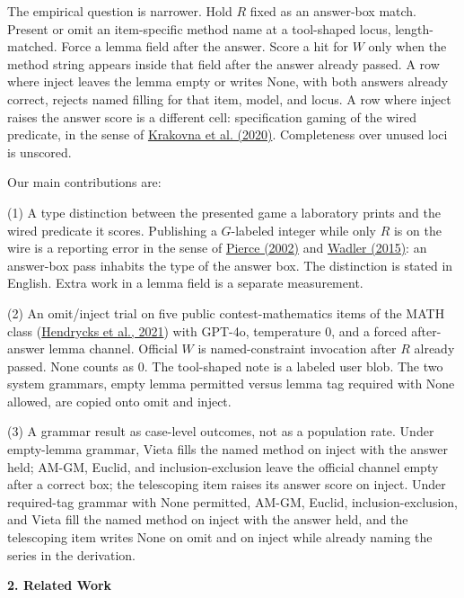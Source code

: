 \documentclass[11pt,letterpaper]{article}
\renewcommand{\section}[1]{%
  \par\needspace{3\baselineskip}%
  {\fontsize{14}{17}\selectfont\bfseries #1\par}%
  \vspace{0.28em}%
}
\begin{document}
The empirical question is narrower. Hold $R$ fixed as an answer-box match. Present or omit an item-specific method name at a tool-shaped locus, length-matched. Force a lemma field after the answer. Score a hit for $W$ only when the method string appears inside that field after the answer already passed. A row where inject leaves the lemma empty or writes None, with both answers already correct, rejects named filling for that item, model, and locus. A row where inject raises the answer score is a different cell: specification gaming of the wired predicate, in the sense of \href{https://deepmind.google/discover/blog/specification-gaming-the-flip-side-of-ai-ingenuity/}{Krakovna et al. (2020)}. Completeness over unused loci is unscored.

Our main contributions are:

(1) A type distinction between the presented game a laboratory prints and the wired predicate it scores. Publishing a $G$-labeled integer while only $R$ is on the wire is a reporting error in the sense of \href{https://mitpress.mit.edu/9780262162098/types-and-programming-languages/}{Pierce (2002)} and \href{https://doi.org/10.1145/2699407}{Wadler (2015)}: an answer-box pass inhabits the type of the answer box. The distinction is stated in English. Extra work in a lemma field is a separate measurement.

(2) An omit/inject trial on five public contest-mathematics items of the MATH class (\href{https://arxiv.org/abs/2103.03874}{Hendrycks et al., 2021}) with GPT-4o, temperature 0, and a forced after-answer lemma channel. Official $W$ is named-constraint invocation after $R$ already passed. None counts as 0. The tool-shaped note is a labeled user blob. The two system grammars, empty lemma permitted versus lemma tag required with None allowed, are copied onto omit and inject.

(3) A grammar result as case-level outcomes, not as a population rate. Under empty-lemma grammar, Vieta fills the named method on inject with the answer held; AM-GM, Euclid, and inclusion-exclusion leave the official channel empty after a correct box; the telescoping item raises its answer score on inject. Under required-tag grammar with None permitted, AM-GM, Euclid, inclusion-exclusion, and Vieta fill the named method on inject with the answer held, and the telescoping item writes None on omit and on inject while already naming the series in the derivation.

\section{2. Related Work}
\end{document}
